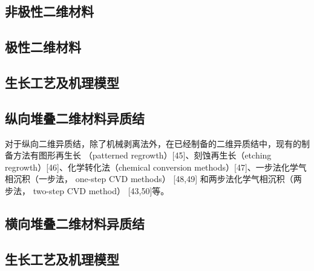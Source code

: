 \subsection{非极性二维材料}

\subsection{极性二维材料}
\subsection{生长工艺及机理模型}

\subsection{纵向堆叠二维材料异质结}
对于纵向二维异质结，除了机械剥离法外，在已经制备的二维异质结中，现有的制备方法有图形再生长
（patterned regrowth）[45]、刻蚀再生长（etching regrowth）[46]、化学转化法（chemical 
conversion methods）[47]、一步法化学气相沉积（一步法， one-step CVD methods） [48,49]
和两步法化学气相沉积（两步法， two-step CVD method） [43,50]等。

\subsection{横向堆叠二维材料异质结}

\subsection{生长工艺及机理模型}


